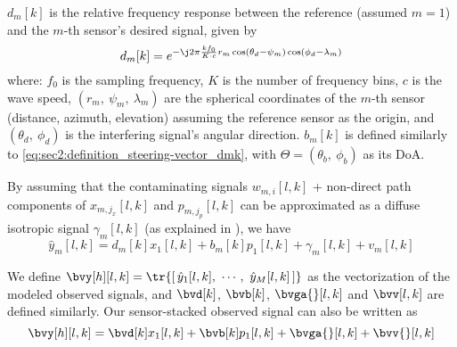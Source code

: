 $d_m[k]$ is the relative frequency response between the reference (assumed $m=1$) and the $m$-th sensor's desired signal, given by
\begin{equation}
	\label{eq:sec2:definition_steering-vector_dmk}
	d_m[k] = e^{-\j 2\pi \frac{k f_0}{K\cdot c} r_m \cos(\theta_d - \psi_m) \cos(\phi_d - \lambda_m)}
\end{equation}
where: $f_0$ is the sampling frequency, $K$ is the number of frequency bins, $c$ is the wave speed, $(r_m,~\psi_m,~\lambda_m)$ are the spherical coordinates of the $m$-th sensor (distance, azimuth, elevation) assuming the reference sensor as the origin, and $(\theta_d,~\phi_d)$ is the interfering signal's angular direction. $b_m[k]$ is defined similarly to \cref{eq:sec2:definition_steering-vector_dmk}, with $\Theta = (\theta_b,~\phi_b)$ as its DoA.

By assuming that the contaminating signals $w_{m,i}[l,k]$ + non-direct path components of $x_{m,j_x}[l,k]$ and $p_{m,j_p}[l,k]$ can be approximated as a diffuse isotropic signal $\gamma_m[l,k]$ (as explained in \cite{moore_compact_2022}), we have
\begin{equation}
	\hat{y}_m[l,k] = d_m[k] x_1[l,k] + b_m[k] p_1[l,k] + \gamma_m[l,k] + v_m[l,k]
\end{equation}

We define $\bvy[h][l,k] = \tr{\left[\,\hat{y}_1[l,k],~\cdots,~\hat{y}_M[l,k]\,\right]}$ as the vectorization of the modeled observed signals, and $\bvd[k]$, $\bvb[k]$, $\bvga{}[l,k]$ and $\bvv[l,k]$ are defined similarly. Our sensor-stacked observed signal can also be written as
\begin{equation}
	\bvy[h][l,k] = \bvd[k] x_1[l,k] + \bvb[k] p_1[l,k] + \bvga{}[l,k] + \bvv{}[l,k]
\end{equation}


